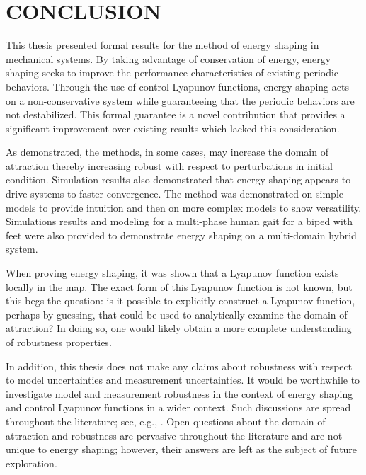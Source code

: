 \chapter{\uppercase{Conclusion}}

This thesis presented formal results for the method of energy shaping in
mechanical systems.
%
By taking advantage of conservation of energy, energy shaping seeks to improve
the performance characteristics of existing periodic behaviors.
%
Through the use of control Lyapunov functions, energy shaping acts on a
non-conservative system while guaranteeing that the periodic behaviors are not
destabilized.
%
This formal guarantee is a novel contribution that provides a significant
improvement over existing results which lacked this consideration.

As demonstrated, the methods, in some cases, may increase the domain of
attraction thereby increasing robust with respect to perturbations in initial
condition.
%
Simulation results also demonstrated that energy shaping appears to drive
systems to faster convergence.
The method was demonstrated on simple models to provide intuition and then on
more complex models to show versatility.
%
Simulations results and modeling for a multi-phase human gait for a biped with
feet were also provided to demonstrate energy shaping on a multi-domain hybrid
system.

When proving energy shaping, it was shown that a Lyapunov function exists
locally in the \Poincare{} map.
%
The exact form of this Lyapunov function is not known, but this begs the
question:
%
is it possible to explicitly construct a Lyapunov function, perhaps by guessing,
that could be used to analytically examine the domain of attraction?
%
In doing so, one would likely obtain a more complete understanding of robustness
properties.
%

In addition, this thesis does not make any claims about robustness with respect
to model uncertainties and measurement uncertainties.
%
It would be worthwhile to investigate model and measurement robustness in the
context of energy shaping and control Lyapunov functions in a wider context.
%
Such discussions are spread throughout the literature; see, e.g.,
\cite{Freeman1996}.
%
Open questions about the domain of attraction and robustness are pervasive
throughout the literature and are not unique to energy shaping;
%
however, their answers are left as the subject of future exploration.

